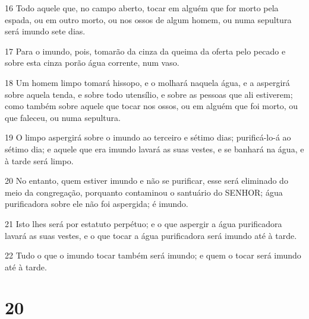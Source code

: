 \par 16 Todo aquele que, no campo aberto, tocar em alguém que for morto pela espada, ou em outro morto, ou nos ossos de algum homem, ou numa sepultura será imundo sete dias.
\par 17 Para o imundo, pois, tomarão da cinza da queima da oferta pelo pecado e sobre esta cinza porão água corrente, num vaso.
\par 18 Um homem limpo tomará hissopo, e o molhará naquela água, e a aspergirá sobre aquela tenda, e sobre todo utensílio, e sobre as pessoas que ali estiverem; como também sobre aquele que tocar nos ossos, ou em alguém que foi morto, ou que faleceu, ou numa sepultura.
\par 19 O limpo aspergirá sobre o imundo ao terceiro e sétimo dias; purificá-lo-á ao sétimo dia; e aquele que era imundo lavará as suas vestes, e se banhará na água, e à tarde será limpo.
\par 20 No entanto, quem estiver imundo e não se purificar, esse será eliminado do meio da congregação, porquanto contaminou o santuário do SENHOR; água purificadora sobre ele não foi aspergida; é imundo.
\par 21 Isto lhes será por estatuto perpétuo; e o que aspergir a água purificadora lavará as suas vestes, e o que tocar a água purificadora será imundo até à tarde.
\par 22 Tudo o que o imundo tocar também será imundo; e quem o tocar será imundo até à tarde.

\chapter{20}

